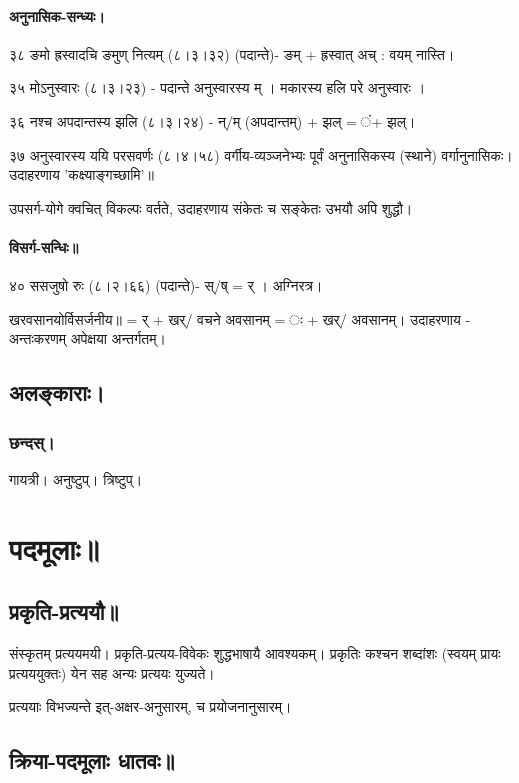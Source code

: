 \documentclass[oneside, article]{memoir}
\begin{document}
\subsection{अनुनासिक-सन्ध्यः।}
३८ ङमो ह्रस्वादचि ङमुण् नित्यम् (८।३।३२) (पदान्ते)- ङम् + ह्रस्वात् अच् : वयम् नास्ति।

३५ मोऽनुस्वारः (८।३।२३) - पदान्ते अनुस्वारस्य म् । मकारस्य हलि परे अनुस्वारः ।

३६ नश्च अपदान्तस्य झलि (८।३।२४)  - न्/म् (अपदान्तम्) + झल् = ं+ झल्। 

३७ अनुस्वारस्य ययि परसवर्णः (८।४।५८)
वर्गीय-व्यञ्जनेभ्यः पूर्वं अनुनासिकस्य (स्थाने) वर्गानुनासिकः। उदाहरणाय 'कक्ष्याङ्गच्छामि'॥ 

उपसर्ग-योगे क्वचित् विकल्पः वर्तते, उदाहरणाय संकेतः च सङ्केतः उभयौ अपि शुद्धौ।

\subsection{विसर्ग-सन्धिः॥}
४० ससजुषो रुः (८।२।६६) (पदान्ते)- स्/ष् = र् । अग्निरत्र।

खरवसानयोर्विसर्जनीय॥ = र् + खर्/ वचने अवसानम् = ः + खर्/ अवसानम्। उदाहरणाय - अन्तःकरणम् अपेक्षया अन्तर्गतम्।



\chapter{अलङ्काराः।}
\section{छन्दस्।}
गायत्री। अनुष्टुप्। त्रिष्टुप्।

\part{पदमूलाः॥}
\chapter{प्रकृति-प्रत्ययौ॥}
संस्कृतम् प्रत्ययमयी। प्रकृति-प्रत्यय-विवेकः शुद्धभाषायै आवश्यकम्। प्रकृतिः कश्चन शब्दांशः (स्वयम् प्रायः
प्रत्यययुक्तः) येन सह अन्यः प्रत्ययः युज्यते।

प्रत्ययाः विभज्यन्ते इत्-अक्षर-अनुसारम्, च प्रयोजनानुसारम्।

\chapter{क्रिया-पदमूलाः धातवः॥}
\end{document}
